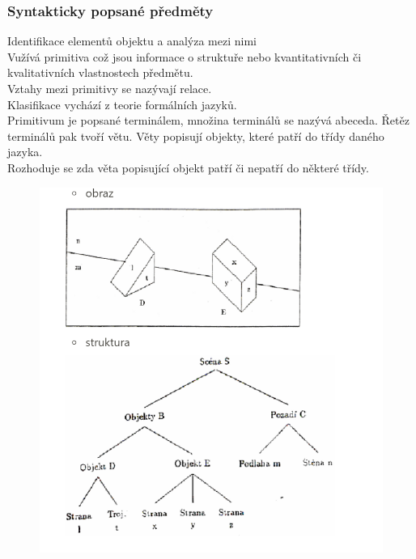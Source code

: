 \subsubsection{Syntakticky popsané předměty}

Identifikace elementů objektu a analýza mezi nimi\\
Vužívá primitiva což jsou informace o struktuře nebo kvantitativních či kvalitativních vlastnostech předmětu.\\
Vztahy mezi primitivy se nazývají relace.\\
Klasifikace vychází z teorie formálních jazyků.\\
Primitivum je popsané terminálem, množina terminálů se nazývá abeceda. Řetěz terminálů pak tvoří větu. Věty popisují objekty, které patří do třídy daného jazyka.\\
Rozhoduje se zda věta popisující objekt patří či nepatří do některé třídy.\\
\begin{figure}[H]
    \includegraphics[scale = 0.7]{images/syntakticke.png}
\end{figure}
